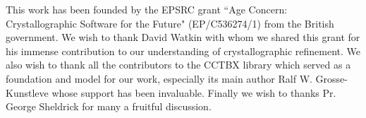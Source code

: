 \documentclass{iucr}
\begin{document}

This work has been founded by the EPSRC grant ``Age Concern: Crystallographic Software for the Future" (EP/C536274/1) from the British government. We wish to thank David Watkin with whom we shared this grant for his immense contribution to our understanding of crystallographic refinement. We also wish to thank all the contributors to the CCTBX library which served as a foundation and model for our work, especially its main author Ralf W. Grosse-Kunstleve whose support has been invaluable. Finally we wish to thanks Pr. George Sheldrick for many a fruitful discussion.

\end{document}
